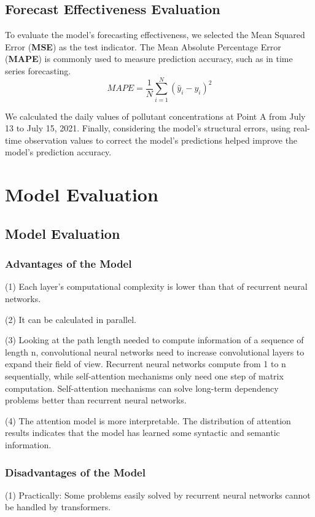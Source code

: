 \documentclass[12pt]{article}
\begin{document}
\subsection{Forecast Effectiveness Evaluation}
To evaluate the model's forecasting effectiveness, we selected the Mean Squared Error (\textbf{MSE}) as the test indicator. The Mean Absolute Percentage Error (\textbf{MAPE}) is commonly used to measure prediction accuracy, such as in time series forecasting.
\begin{equation}
	M A P E=\frac{1}{N} \sum_{i=1}^N\left(\hat{y}_i-y_i\right)^2
\end{equation}

We calculated the daily values of pollutant concentrations at Point A from July 13 to July 15, 2021. Finally, considering the model's structural errors, using real-time observation values to correct the model's predictions helped improve the model's prediction accuracy.

\section{Model Evaluation}
\subsection{Model Evaluation}
\subsubsection{Advantages of the Model}
(1) Each layer's computational complexity is lower than that of recurrent neural networks.

(2) It can be calculated in parallel.

(3) Looking at the path length needed to compute information of a sequence of length n, convolutional neural networks need to increase convolutional layers to expand their field of view. Recurrent neural networks compute from 1 to n sequentially, while self-attention mechanisms only need one step of matrix computation. Self-attention mechanisms can solve long-term dependency problems better than recurrent neural networks.

(4) The attention model is more interpretable. The distribution of attention results indicates that the model has learned some syntactic and semantic information.
\subsubsection{Disadvantages of the Model}
(1) Practically: Some problems easily solved by recurrent neural networks cannot be handled by transformers.
\end{document}

